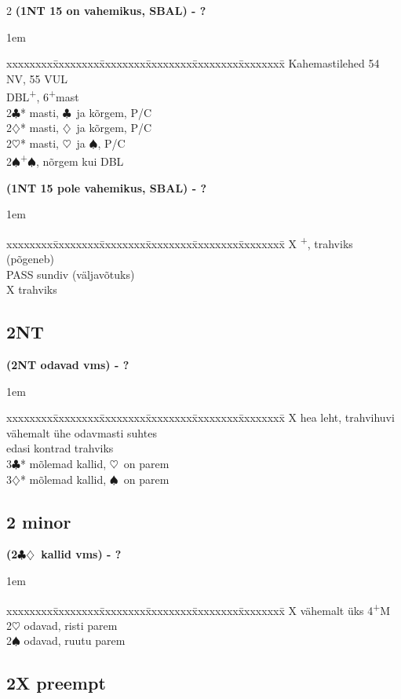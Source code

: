 \documentclass[10pt]{article}
\renewcommand{\c}{$\clubsuit$}
\renewcommand{\d}{$\diamondsuit$}
\newcommand{\h}{$\heartsuit$}
\newcommand{\s}{$\spadesuit$}
\newcommand{\p}{\textsuperscript{+}}
\newcommand{\x}{DBL}
\newenvironment{bidtable}[1][]
{\textbf{#1}
  \begin{adjustwidth}{1em}{}
    \addvspace{2pt}
    \begin{tabbing}
      xxxxxxxx\=xxxxxxxx\=xxxxxxxx\=xxxxxxxx\=xxxxxxxx\=xxxxxxxx\=\kill}
{\end{tabbing}\end{adjustwidth}\bigskip}%
\begin{document}
\begin{multicols*}{2}
\begin{bidtable}[(1NT 15 on vahemikus, SBAL) - ?]
Kahemastilehed 54 NV, 55 VUL       \\
\x   {}\p, 6\p mast             \\
2\c* {} masti, \c\ ja kõrgem, P/C \\
2\d* {} masti, \d\ ja kõrgem, P/C \\
2\h* {} masti, \h\ ja \s, P/C     \\
2\s  {}\p\s, nõrgem kui \x
\end{bidtable}

\begin{bidtable}[(1NT 15 pole vahemikus, SBAL) - ?]
X \p, trahviks                   \\
  \> (põgeneb)                        \\
  \>  \> PASS \> sundiv (väljavõtuks) \\
  \>  \> X    \> trahviks
\end{bidtable}

\subsection{2NT}

\begin{bidtable}[(2NT odavad vms) - ?]
X    \> hea leht, trahvihuvi vähemalt ühe odavmasti suhtes \\
     \> edasi kontrad trahviks                             \\
3\c* \> mõlemad kallid, \h\ on parem                       \\
3\d* \> mõlemad kallid, \s\ on parem
\end{bidtable}

\subsection{2 minor}

\begin{bidtable}[(2\c\d\ kallid vms) - ?]
X   \> vähemalt üks 4\p M     \\
2\h {} odavad, risti parem \\
2\s {} odavad, ruutu parem
\end{bidtable}

\newpage
\subsection{2X preempt}


\end{multicols*}
\end{document}

